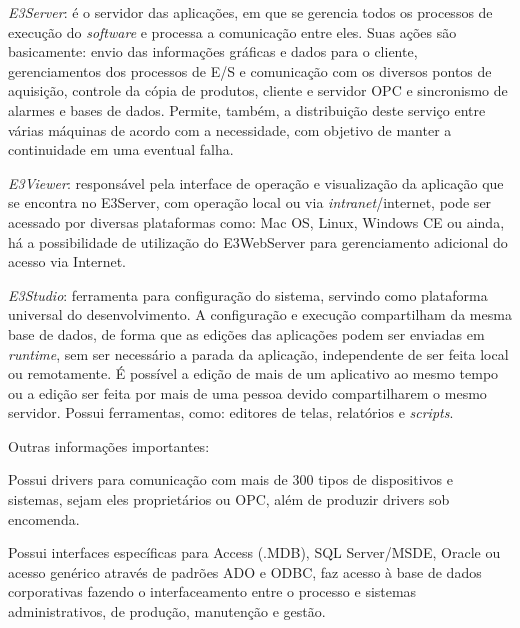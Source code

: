     \begin{alineascomponto}
    	\item \textit{E3Server}: é o servidor das aplicações, em que se gerencia todos os processos de execução do \textit{software} e processa a comunicação entre eles. Suas ações são basicamente: envio das informações gráficas e dados para o cliente, gerenciamentos dos processos de E/S e comunicação com os diversos pontos de aquisição, controle da cópia de produtos, cliente e servidor OPC e sincronismo de alarmes e bases de dados. Permite, também, a distribuição deste serviço entre várias máquinas de acordo com a necessidade, com objetivo de manter a continuidade em uma eventual falha.
    	\item \textit{E3Viewer}: responsável pela interface de operação e visualização da aplicação que se encontra no E3Server, com operação local ou via \textit{intranet}/internet, pode ser acessado por diversas plataformas como: Mac OS, Linux, Windows CE ou ainda, há a possibilidade de utilização do E3WebServer para gerenciamento adicional do acesso via Internet.
    	\item \textit{E3Studio}: ferramenta para configuração do sistema, servindo como plataforma universal do desenvolvimento. A configuração e execução compartilham da mesma base de dados, de forma que as edições das aplicações podem ser enviadas em \textit{runtime}, sem ser necessário a parada da aplicação, independente de ser feita local ou remotamente. É possível a edição de mais de um aplicativo ao mesmo tempo ou a edição ser feita por mais de uma pessoa devido compartilharem o mesmo servidor. Possui ferramentas, como: editores de telas, relatórios e \textit{scripts}.
    \end{alineascomponto}
    
    Outras informações importantes:
    
    \begin{alineascomponto}
    	\item Possui drivers para comunicação com mais de 300 tipos de dispositivos e sistemas, sejam eles proprietários ou \gls{OPC}, além de produzir drivers sob encomenda.
    	\item Possui interfaces específicas para Access (.MDB), SQL Server/MSDE, Oracle ou acesso genérico através de padrões ADO e ODBC, faz acesso à base de dados corporativas fazendo o interfaceamento entre o processo e sistemas administrativos, de produção, manutenção e gestão.
    \end{alineascomponto}
    
